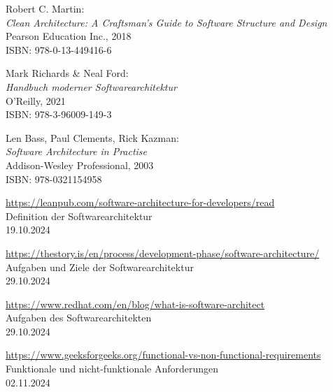 \begin{thebibliography}{999}

    Robert C. Martin: \\
        \emph{Clean Architecture: A Craftsman's Guide to Software Structure and Design} \\
        Pearson Education Inc., 2018 \\
        ISBN: 978-0-13-449416-6

    Mark Richards \& Neal Ford: \\
        \emph{Handbuch moderner Softwarearchitektur} \\
        O'Reilly, 2021 \\
        ISBN: 978-3-96009-149-3

    Len Bass, Paul Clements, Rick Kazman: \\
        \emph{Software Architecture in Practise} \\
        Addison-Wesley Professional, 2003 \\
        ISBN: 978-0321154958

    \href{https://leanpub.com/software-architecture-for-developers/read}{https://leanpub.com/software-architecture-for-developers/read} \\
    Definition der Softwarearchitektur \\
    19.10.2024

    \href{https://thestory.is/en/process/development-phase/software-architecture/}{https://thestory.is/en/process/development-phase/software-architecture/} \\
    Aufgaben und Ziele der Softwarearchitektur \\
    29.10.2024

    \href{https://www.redhat.com/en/blog/what-is-software-architect}{https://www.redhat.com/en/blog/what-is-software-architect} \\
    Aufgaben des Softwarearchitekten \\
    29.10.2024 

    \href{https://www.geeksforgeeks.org/functional-vs-non-functional-requirements}{https://www.geeksforgeeks.org/functional-vs-non-functional-requirements} \\
    Funktionale und nicht-funktionale Anforderungen \\
    02.11.2024


\end{thebibliography}
